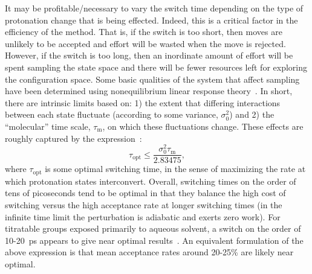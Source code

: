 It may be profitable/necessary to vary the switch time depending on the type of
  protonation change that is being effected.
Indeed, this is a critical factor in the efficiency of the method.
That is, if the switch is too short, then moves are unlikely to be accepted and
  effort will be wasted when the move is rejected.
However, if the switch is too long, then an inordinate amount of effort will be
  spent sampling the state space and there will be fewer resources left for
  exploring the configuration space.
Some basic qualities of the system that affect sampling have been determined
  using nonequilibrium linear response
  theory~\cite{Radak_JChemPhys_2016_v145_p134109}.
In short, there are intrinsic limits based on:
  1) the extent that differing interactions between each state fluctuate
  (according to some variance, $\sigma_0^2$)
  and
  2) the ``molecular'' time scale, $\tau_{\text{m}}$, on which these
  fluctuations change.
These effects are roughly captured by the
  expression~\cite{Radak_JChemPhys_2016_v145_p134109,
    Radak_JChemTheoryComput_2017_v13_p5933}:
\begin{equation*}
  \tau_{\text{opt}}
  \le
  \frac{\sigma_0^2 \tau_{\text{m}}}{2.83475},
\end{equation*}
  where $\tau_{\text{opt}}$ is some optimal switching time, in the sense of
  maximizing the rate at which protonation states interconvert.
Overall, switching times on the order of tens of picoseconds tend to be optimal
  in that they balance the high cost of switching versus the high acceptance
  rate at longer switching times (in the infinite time limit the perturbation
  is adiabatic and exerts zero work).
For titratable groups exposed primarily to aqueous solvent, a switch on the
  order of 10-20~ps appears to give near optimal
  results~\cite{Radak_JChemPhys_2016_v145_p134109,
    Radak_JChemTheoryComput_2017_v13_p5933}. 
An equivalent formulation of the above expression is that mean acceptance rates
  around 20-25\% are likely near optimal.

